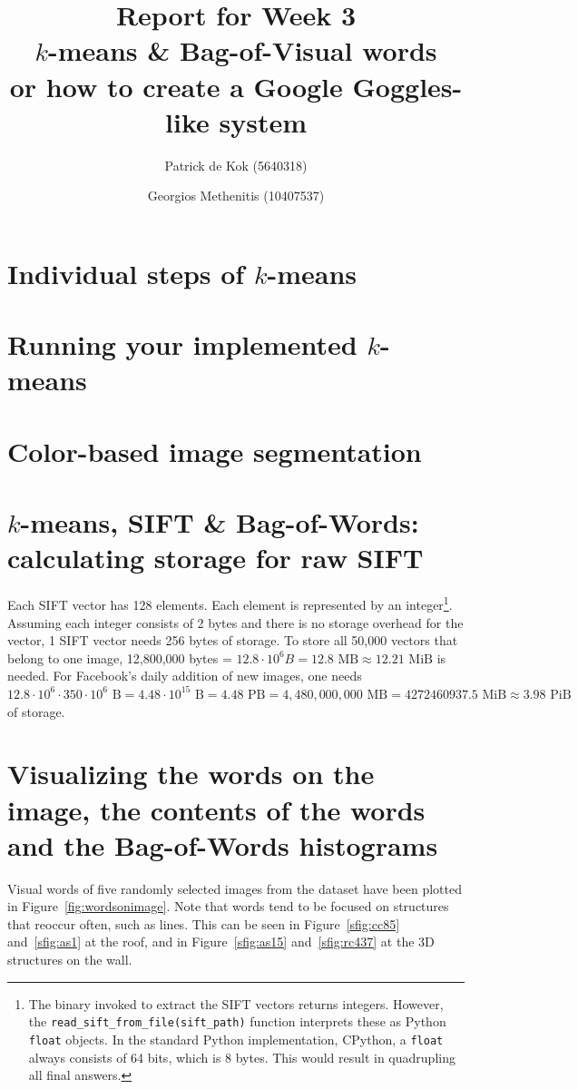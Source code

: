 \documentclass[a4paper,10pt,twoside]{article}
\title{Report for Week 3 \\\normalsize $k$-means \& Bag-of-Visual words\\ or how to create a Google Goggles-like system}
\author{Patrick de Kok (5640318) \and Georgios Methenitis (10407537)}
\begin{document}
\maketitle
\thispagestyle{empty}

\section{Individual steps of $k$-means}

\section{Running your implemented $k$-means}

\section{Color-based image segmentation}

\section{$k$-means, SIFT \& Bag-of-Words: calculating storage for raw SIFT}
Each SIFT vector has 128 elements.  Each element is represented by an integer\footnote{The binary invoked to extract the SIFT vectors returns integers.  However, the \texttt{read\_sift\_from\_file(sift\_path)} function interprets these as Python \texttt{float} objects.  In the standard Python implementation, CPython, a \texttt{float} always consists of 64 bits, which is 8 bytes.  This would result in quadrupling all final answers.}.  Assuming each integer consists of 2 bytes and there is no storage overhead for the vector, 1 SIFT vector needs 256 bytes of storage.  To store all 50,000 vectors that belong to one image, 12,800,000 bytes = $12.8 \cdot 10^6 B = 12.8 \mbox{ MB} \approx 12.21 \mbox{ MiB}$ is needed.  For Facebook's daily addition of new images, one needs $12.8 \cdot 10^6 \cdot 350 \cdot 10^6 \mbox{ B} = 4.48 \cdot 10^{15} \mbox{ B} = 4.48 \mbox{ PB} = 4,480,000,000 \mbox{ MB} = 4272460937.5 \mbox{ MiB} \approx 3.98 \mbox{ PiB}$ of storage.

\section{Visualizing the words on the image, the contents of the words and the Bag-of-Words histograms}
Visual words of five randomly selected images from the dataset have been plotted in Figure~\ref{fig:wordsonimage}.  Note that words tend to be focused on structures that reoccur often, such as lines.  This can be seen in Figure~\ref{sfig:cc85} and~\ref{sfig:as1} at the roof, and in Figure~\ref{sfig:as15} and~\ref{sfig:rc437} at the 3D structures on the wall.
\end{document}
